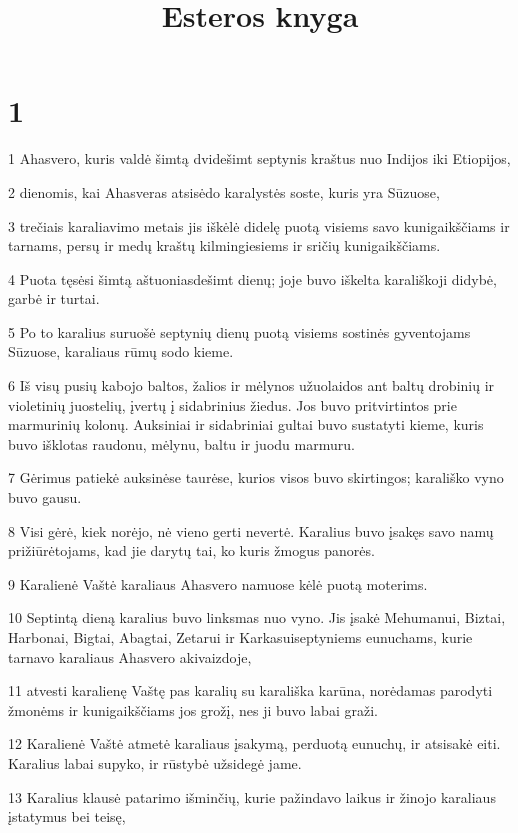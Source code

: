 

\title{Esteros knyga}

\chapter{1}


\par 1 Ahasvero, kuris valdė šimtą dvidešimt septynis kraštus nuo Indijos iki Etiopijos, 
\par 2 dienomis, kai Ahasveras atsisėdo karalystės soste, kuris yra Sūzuose, 
\par 3 trečiais karaliavimo metais jis iškėlė didelę puotą visiems savo kunigaikščiams ir tarnams, persų ir medų kraštų kilmingiesiems ir sričių kunigaikščiams. 
\par 4 Puota tęsėsi šimtą aštuoniasdešimt dienų; joje buvo iškelta karališkoji didybė, garbė ir turtai. 
\par 5 Po to karalius suruošė septynių dienų puotą visiems sostinės gyventojams Sūzuose, karaliaus rūmų sodo kieme. 
\par 6 Iš visų pusių kabojo baltos, žalios ir mėlynos užuolaidos ant baltų drobinių ir violetinių juostelių, įvertų į sidabrinius žiedus. Jos buvo pritvirtintos prie marmurinių kolonų. Auksiniai ir sidabriniai gultai buvo sustatyti kieme, kuris buvo išklotas raudonu, mėlynu, baltu ir juodu marmuru. 
\par 7 Gėrimus patiekė auksinėse taurėse, kurios visos buvo skirtingos; karališko vyno buvo gausu. 
\par 8 Visi gėrė, kiek norėjo, nė vieno gerti nevertė. Karalius buvo įsakęs savo namų prižiūrėtojams, kad jie darytų tai, ko kuris žmogus panorės. 
\par 9 Karalienė Vaštė karaliaus Ahasvero namuose kėlė puotą moterims. 
\par 10 Septintą dieną karalius buvo linksmas nuo vyno. Jis įsakė Mehumanui, Biztai, Harbonai, Bigtai, Abagtai, Zetarui ir Karkasui­septyniems eunuchams, kurie tarnavo karaliaus Ahasvero akivaizdoje, 
\par 11 atvesti karalienę Vaštę pas karalių su karališka karūna, norėdamas parodyti žmonėms ir kunigaikščiams jos grožį, nes ji buvo labai graži. 
\par 12 Karalienė Vaštė atmetė karaliaus įsakymą, perduotą eunuchų, ir atsisakė eiti. Karalius labai supyko, ir rūstybė užsidegė jame. 
\par 13 Karalius klausė patarimo išminčių, kurie pažindavo laikus ir žinojo karaliaus įstatymus bei teisę, 
